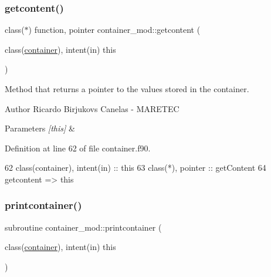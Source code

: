 \subsubsection{\texorpdfstring{getcontent()}{getcontent()}}
{\footnotesize\ttfamily class($\ast$) function, pointer container\+\_\+mod\+::getcontent (\begin{DoxyParamCaption}\item[{class(\mbox{\hyperlink{structcontainer__mod_1_1container}{container}}), intent(in)}]{this }\end{DoxyParamCaption})\hspace{0.3cm}{\ttfamily [private]}}



Method that returns a pointer to the values stored in the container. 

\begin{DoxyAuthor}{Author}
Ricardo Birjukovs Canelas -\/ M\+A\+R\+E\+T\+EC 
\end{DoxyAuthor}

\begin{DoxyParams}{Parameters}
{\em \mbox{[}this\mbox{]}} & \\
\hline
\end{DoxyParams}


Definition at line 62 of file container.\+f90.


\begin{DoxyCode}
62     \textcolor{keywordtype}{class}(container), \textcolor{keywordtype}{intent(in)} :: this
63     \textcolor{keywordtype}{class}(*), \textcolor{keywordtype}{pointer} :: getContent
64     getcontent => this%
\end{DoxyCode}
\mbox{\label{namespacecontainer__mod_abf1785185971a527e437d3a489462724}} 
\subsubsection{\texorpdfstring{printcontainer()}{printcontainer()}}
{\footnotesize\ttfamily subroutine container\+\_\+mod\+::printcontainer (\begin{DoxyParamCaption}\item[{class(\mbox{\hyperlink{structcontainer__mod_1_1container}{container}}), intent(in)}]{this }\end{DoxyParamCaption})\hspace{0.3cm}{\ttfamily [private]}}



